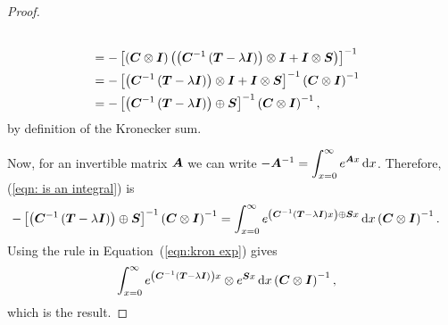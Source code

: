 \begin{proof}
\begin{align}
		\\&= - \left[\left(\boldsymbol{C}\otimes \boldsymbol{I}\right)\left(\left(\boldsymbol{C}^{-1}\left(\boldsymbol{T}-\lambda \boldsymbol{I}\right)\right)\otimes \boldsymbol{I} + \boldsymbol{I}\otimes \boldsymbol{S}\right)\right]^{-1} \nonumber
		\\&= - \left[\left(\boldsymbol{C}^{-1}\left(\boldsymbol{T}-\lambda \boldsymbol{I}\right)\right)\otimes \boldsymbol{I} + \boldsymbol{I}\otimes \boldsymbol{S}\right]^{-1}\left(\boldsymbol{C}\otimes \boldsymbol{I}\right)^{-1} \nonumber
		\\&= - \left[\left(\boldsymbol{C}^{-1}\left(\boldsymbol{T}-\lambda \boldsymbol{I}\right)\right)\oplus \boldsymbol{S}\right]^{-1}\left(\boldsymbol{C}\otimes \boldsymbol{I}\right)^{-1},\label{eqn: is an integral}
	\end{align}
	by definition of the Kronecker sum.
	
	Now, for an invertible matrix \(\boldsymbol A\) we can write \(-\boldsymbol A^{-1} = \displaystyle\int_{x=0}^\infty e^{\boldsymbol Ax}\, \mathrm{d} x\). Therefore, (\ref{eqn: is an integral}) is 
	\begin{align*}
		-\left[\left(\boldsymbol{C}^{-1}\left(\boldsymbol{T}-\lambda \boldsymbol{I}\right)\right)\oplus \boldsymbol{S}\right]^{-1}\left(\boldsymbol{C}\otimes \boldsymbol{I}\right)^{-1}
		&= \int_{x=0}^\infty e^{\left(\boldsymbol{C}^{-1}\left(\boldsymbol{T}-\lambda \boldsymbol{I}\right)x\right)\oplus \boldsymbol{S}x}\, \mathrm{d} x\left(\boldsymbol{C}\otimes \boldsymbol{I}\right)^{-1}.
	\end{align*}
	{Using the rule in Equation~(\ref{eqn:kron exp}) gives }
	\begin{align*}
		&\int_{x=0}^\infty e^{\left(\boldsymbol{C}^{-1}\left(\boldsymbol{T}-\lambda \boldsymbol{I}\right)\right)x}\otimes e^{ \boldsymbol{S}x}\, \mathrm{d} x\left(\boldsymbol{C}\otimes \boldsymbol{I}\right)^{-1},
	\end{align*}
	which is the result.
\end{proof}

